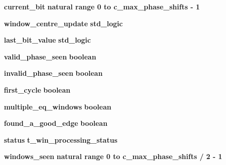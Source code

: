 \begin{DoxyCompactItemize}
\item 
{\bf current\+\_\+bit} {\bfseries {\bfseries \textcolor{comment}{natural}\textcolor{vhdlchar}{ }\textcolor{vhdlchar}{ }\textcolor{vhdlchar}{ }\textcolor{keywordflow}{range}\textcolor{vhdlchar}{ }\textcolor{vhdlchar}{ } \textcolor{vhdldigit}{0} \textcolor{vhdlchar}{ }\textcolor{keywordflow}{to}\textcolor{vhdlchar}{ }\textcolor{vhdlchar}{ }\textcolor{vhdlchar}{ }\textcolor{vhdlchar}{ }{\bfseries {\bf c\+\_\+max\+\_\+phase\+\_\+shifts}} \textcolor{vhdlchar}{-\/}\textcolor{vhdlchar}{ } \textcolor{vhdldigit}{1} \textcolor{vhdlchar}{ }}} 
\item 
{\bf window\+\_\+centre\+\_\+update} {\bfseries {\bfseries \textcolor{comment}{std\+\_\+logic}\textcolor{vhdlchar}{ }}} 
\item 
{\bf last\+\_\+bit\+\_\+value} {\bfseries {\bfseries \textcolor{comment}{std\+\_\+logic}\textcolor{vhdlchar}{ }}} 
\item 
{\bf valid\+\_\+phase\+\_\+seen} {\bfseries {\bfseries \textcolor{comment}{boolean}\textcolor{vhdlchar}{ }}} 
\item 
{\bf invalid\+\_\+phase\+\_\+seen} {\bfseries {\bfseries \textcolor{comment}{boolean}\textcolor{vhdlchar}{ }}} 
\item 
{\bf first\+\_\+cycle} {\bfseries {\bfseries \textcolor{comment}{boolean}\textcolor{vhdlchar}{ }}} 
\item 
{\bf multiple\+\_\+eq\+\_\+windows} {\bfseries {\bfseries \textcolor{comment}{boolean}\textcolor{vhdlchar}{ }}} 
\item 
{\bf found\+\_\+a\+\_\+good\+\_\+edge} {\bfseries {\bfseries \textcolor{comment}{boolean}\textcolor{vhdlchar}{ }}} 
\item 
{\bf status} {\bfseries {\bfseries {\bfseries {\bf t\+\_\+win\+\_\+processing\+\_\+status}} \textcolor{vhdlchar}{ }}} 
\item 
{\bf windows\+\_\+seen} {\bfseries {\bfseries \textcolor{comment}{natural}\textcolor{vhdlchar}{ }\textcolor{vhdlchar}{ }\textcolor{vhdlchar}{ }\textcolor{keywordflow}{range}\textcolor{vhdlchar}{ }\textcolor{vhdlchar}{ } \textcolor{vhdldigit}{0} \textcolor{vhdlchar}{ }\textcolor{keywordflow}{to}\textcolor{vhdlchar}{ }\textcolor{vhdlchar}{ }\textcolor{vhdlchar}{ }\textcolor{vhdlchar}{ }{\bfseries {\bf c\+\_\+max\+\_\+phase\+\_\+shifts}} \textcolor{vhdlchar}{/}\textcolor{vhdlchar}{ } \textcolor{vhdldigit}{2} \textcolor{vhdlchar}{-\/}\textcolor{vhdlchar}{ } \textcolor{vhdldigit}{1} \textcolor{vhdlchar}{ }}} 
\end{DoxyCompactItemize}


